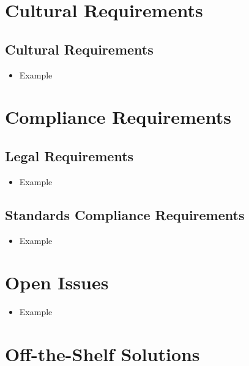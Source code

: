 \documentclass[12pt]{article}
\begin{document}
\section{Cultural Requirements}
  \subsection{Cultural Requirements}
    \begin{itemize}
      \item Example
    \end{itemize}

\section{Compliance Requirements}
  \subsection{Legal Requirements}
    \begin{itemize}
      \item Example
    \end{itemize}

  \subsection{Standards Compliance Requirements}
    \begin{itemize}
      \item Example
    \end{itemize}

\section{Open Issues}
  \begin{itemize}
    \item Example
  \end{itemize}

\section{Off-the-Shelf Solutions}
\end{document}
